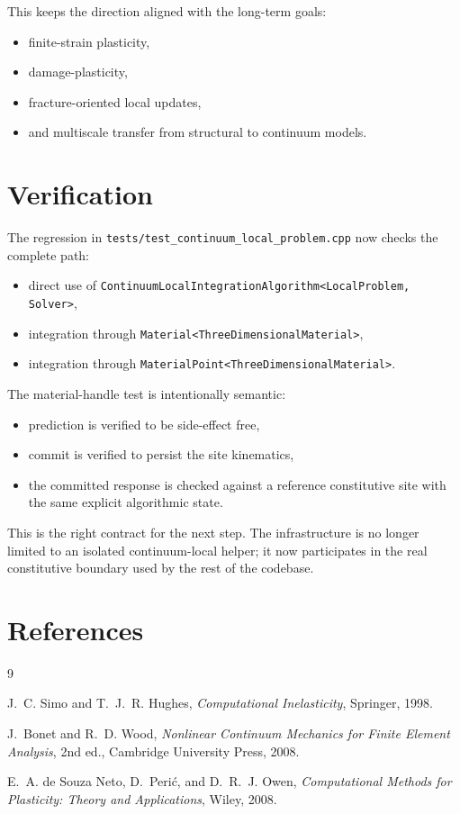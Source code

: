 This keeps the direction aligned with the long-term goals:
\begin{itemize}
  \item finite-strain plasticity,
  \item damage-plasticity,
  \item fracture-oriented local updates,
  \item and multiscale transfer from structural to continuum models.
\end{itemize}

\section{Verification}

The regression in
\texttt{tests/test\_continuum\_local\_problem.cpp}
now checks the complete path:
\begin{itemize}
  \item direct use of
        \texttt{ContinuumLocalIntegrationAlgorithm<LocalProblem, Solver>},
  \item integration through
        \texttt{Material<ThreeDimensionalMaterial>},
  \item integration through
        \texttt{MaterialPoint<ThreeDimensionalMaterial>}.
\end{itemize}

The material-handle test is intentionally semantic:
\begin{itemize}
  \item prediction is verified to be side-effect free,
  \item commit is verified to persist the site kinematics,
  \item the committed response is checked against a reference constitutive site
        with the same explicit algorithmic state.
\end{itemize}

This is the right contract for the next step. The infrastructure is no longer
limited to an isolated continuum-local helper; it now participates in the real
constitutive boundary used by the rest of the codebase.

\section{References}

\begin{thebibliography}{9}

J.~C. Simo and T.~J.~R. Hughes,
\emph{Computational Inelasticity},
Springer, 1998.

J.~Bonet and R.~D. Wood,
\emph{Nonlinear Continuum Mechanics for Finite Element Analysis},
2nd ed., Cambridge University Press, 2008.

E.~A. de Souza Neto, D.~Peri\'{c}, and D.~R.~J. Owen,
\emph{Computational Methods for Plasticity: Theory and Applications},
Wiley, 2008.

\end{thebibliography}

